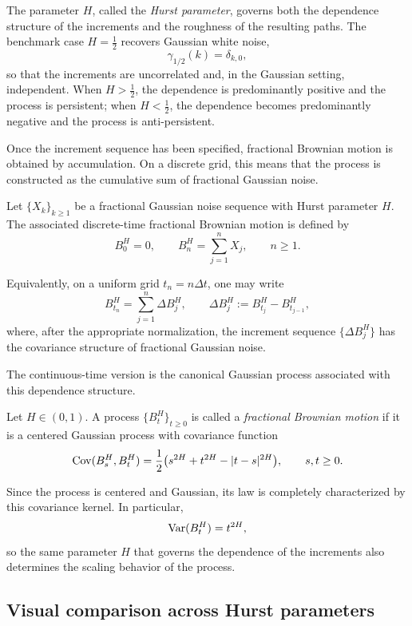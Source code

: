 The parameter \(H\), called the \emph{Hurst parameter}, governs both the dependence structure of the increments and the roughness of the resulting paths. The benchmark case \(H=\tfrac12\) recovers Gaussian white noise,
\[
\gamma_{1/2}(k)=\delta_{k,0},
\]
so that the increments are uncorrelated and, in the Gaussian setting, independent. When \(H>\tfrac12\), the dependence is predominantly positive and the process is persistent; when \(H<\tfrac12\), the dependence becomes predominantly negative and the process is anti-persistent.

Once the increment sequence has been specified, fractional Brownian motion is obtained by accumulation. On a discrete grid, this means that the process is constructed as the cumulative sum of fractional Gaussian noise.

\begin{definition}
Let \(\{X_k\}_{k\ge 1}\) be a fractional Gaussian noise sequence with Hurst parameter \(H\). The associated discrete-time fractional Brownian motion is defined by
\[
B_0^H=0,
\qquad
B_n^H=\sum_{j=1}^{n}X_j,
\qquad n\ge 1.
\]
\end{definition}

Equivalently, on a uniform grid \(t_n=n\Delta t\), one may write
\[
B^H_{t_n}
=
\sum_{j=1}^{n}\Delta B_j^H,
\qquad
\Delta B_j^H:=B^H_{t_j}-B^H_{t_{j-1}},
\]
where, after the appropriate normalization, the increment sequence \(\{\Delta B_j^H\}\) has the covariance structure of fractional Gaussian noise.

The continuous-time version is the canonical Gaussian process associated with this dependence structure.

\begin{definition}
Let \(H\in(0,1)\). A process \(\{B_t^H\}_{t\ge 0}\) is called a \emph{fractional Brownian motion} if it is a centered Gaussian process with covariance function
\[
\operatorname{Cov}(B_s^H,B_t^H)
=
\frac{1}{2}
\bigl(
s^{2H}+t^{2H}-|t-s|^{2H}
\bigr),
\qquad s,t\ge 0.
\]
\end{definition}

Since the process is centered and Gaussian, its law is completely characterized by this covariance kernel. In particular,
\[
\operatorname{Var}(B_t^H)=t^{2H},
\]
so the same parameter \(H\) that governs the dependence of the increments also determines the scaling behavior of the process.

\subsection{Visual comparison across Hurst parameters}

